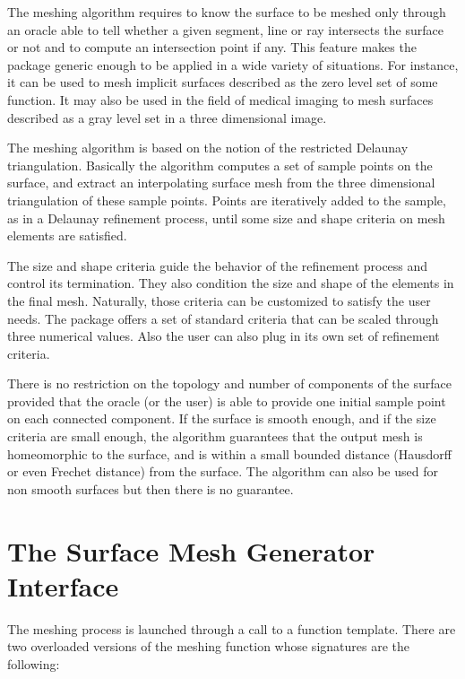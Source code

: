 The meshing algorithm requires to know the surface to be meshed
only  through an oracle able to  tell whether a
given segment, line or ray intersects the surface or not
and to compute an intersection point if any.
This feature makes the package generic enough to be
applied in a wide variety of situations. For instance, it can be
used to mesh implicit surfaces described as the zero level set
of some function. It may also be used in the field of medical imaging
to mesh surfaces described as a gray
level set in a three dimensional image.


The meshing algorithm is based on the notion of the restricted
Delaunay triangulation. Basically the algorithm  computes a set of
sample points on the surface, and extract an interpolating 
surface mesh  from the three dimensional triangulation of these 
sample points. Points are iteratively added to the sample,
as in a Delaunay refinement process, until some size and shape
criteria on mesh elements are satisfied. 


The size and shape criteria guide the  behavior of
the refinement process and control its termination.
They also condition  the size and shape of the elements in the final
mesh. Naturally, those criteria can be customized to satisfy
the user needs. The  package offers
a set of standard criteria that can be scaled through
three numerical values. Also the user can also plug in its own 
set of refinement criteria.

There is no restriction on the topology and number of components
of the surface provided that the oracle (or the user)
is able to provide one initial sample point on each connected component.
If the surface is smooth enough, and if the size criteria are
small enough, the algorithm guarantees 
that the output mesh is homeomorphic to the
surface, and  is within a small bounded distance
(Hausdorff or even Frechet distance) from the surface.
The algorithm can also be used for non smooth surfaces
but then there is no guarantee. 




\section{The Surface Mesh Generator Interface\label{SurfaceMesher_section_interface}}

The meshing process is launched through a call to a function template.
There are two overloaded versions of the meshing function
whose signatures are the following:


